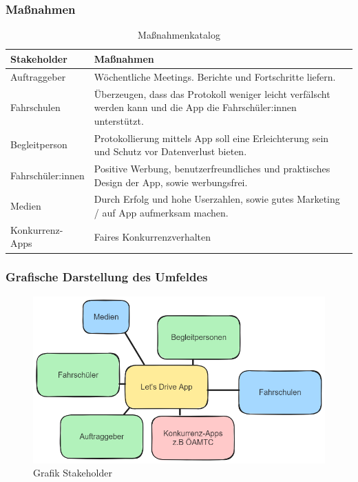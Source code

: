 \subsubsection*{Maßnahmen}
\begin{table}[H]
	\centering
	\begin{tabularx}{\textwidth}{|l|X|}
		\hline
		\textbf{Stakeholder} & \textbf{Maßnahmen} \\
		\hline
		Auftraggeber & Wöchentliche Meetings. Berichte und Fortschritte liefern. \\
		\hline
		Fahrschulen & Überzeugen, dass das Protokoll weniger leicht verfälscht werden kann und die App die Fahrschüler:innen unterstützt. \\
		\hline
		Begleitperson & Protokollierung mittels App soll eine Erleichterung sein und Schutz vor Datenverlust bieten. \\
		\hline
		Fahrschüler:innen & Positive Werbung, benutzerfreundliches und praktisches Design der App, sowie werbungsfrei. \\
		\hline
		Medien & Durch Erfolg und hohe Userzahlen, sowie gutes Marketing / auf App aufmerksam machen. \\
		\hline
		Konkurrenz-Apps & Faires Konkurrenzverhalten \\
		\hline
	\end{tabularx}
	\caption{Maßnahmenkatalog}
	\label{tab:Maßnahmen}
\end{table}


\subsubsection*{Grafische Darstellung des Umfeldes}
\begin{figure}[H]
	\centering
	\includegraphics[width=15cm]{figures/graf_stakeholder.png}
	\caption{Grafik Stakeholder}
	\label{fig:Stakeholder}
\end{figure}


